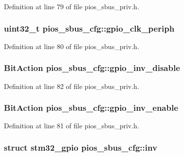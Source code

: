 \-Definition at line 79 of file pios\-\_\-sbus\-\_\-priv.\-h.

\hypertarget{structpios__sbus__cfg_af2100d98daffabe98836f12519330975}{
\subsubsection[{gpio\-\_\-clk\-\_\-periph}]{\setlength{\rightskip}{0pt plus 5cm}uint32\-\_\-t {\bf pios\-\_\-sbus\-\_\-cfg\-::gpio\-\_\-clk\-\_\-periph}}}\label{structpios__sbus__cfg_af2100d98daffabe98836f12519330975}


\-Definition at line 80 of file pios\-\_\-sbus\-\_\-priv.\-h.

\hypertarget{structpios__sbus__cfg_a843ec7deaae570eeab1dc5770e77dafe}{
\subsubsection[{gpio\-\_\-inv\-\_\-disable}]{\setlength{\rightskip}{0pt plus 5cm}\-Bit\-Action {\bf pios\-\_\-sbus\-\_\-cfg\-::gpio\-\_\-inv\-\_\-disable}}}\label{structpios__sbus__cfg_a843ec7deaae570eeab1dc5770e77dafe}


\-Definition at line 82 of file pios\-\_\-sbus\-\_\-priv.\-h.

\hypertarget{structpios__sbus__cfg_ab2b1ec166136b6e8ecfc96fa0c1319b5}{
\subsubsection[{gpio\-\_\-inv\-\_\-enable}]{\setlength{\rightskip}{0pt plus 5cm}\-Bit\-Action {\bf pios\-\_\-sbus\-\_\-cfg\-::gpio\-\_\-inv\-\_\-enable}}}\label{structpios__sbus__cfg_ab2b1ec166136b6e8ecfc96fa0c1319b5}


\-Definition at line 81 of file pios\-\_\-sbus\-\_\-priv.\-h.

\hypertarget{structpios__sbus__cfg_af25f459d6167f8ba7a038ae53b458c46}{
\subsubsection[{inv}]{\setlength{\rightskip}{0pt plus 5cm}struct {\bf stm32\-\_\-gpio} {\bf pios\-\_\-sbus\-\_\-cfg\-::inv}}}\label{structpios__sbus__cfg_af25f459d6167f8ba7a038ae53b458c46}


